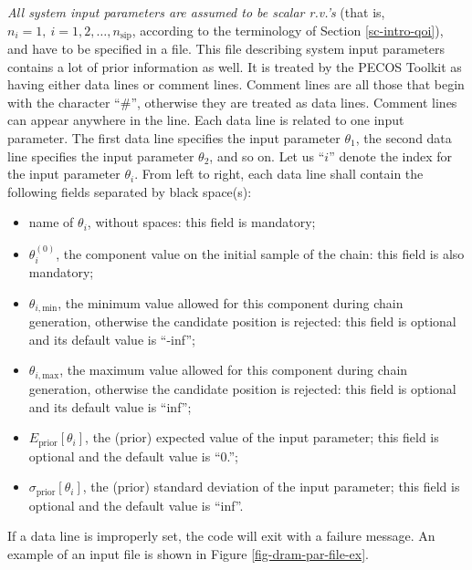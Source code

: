 {\it All system input parameters are assumed to be scalar r.v.'s} (that is, $n_i=1,~i=1,2,\ldots,n_{\text{sip}}$, according to the terminology of Section \ref{sc-intro-qoi}), and
have to be specified in a file.
This file describing system input parameters contains a lot of prior information as well.
It is treated by the PECOS Toolkit as having either data lines or comment lines.
Comment lines are all those that begin with the character ``\#'', otherwise they are treated as data lines.
Comment lines can appear anywhere in the line.
Each data line is related to one input parameter.
The first data line specifies the input parameter $\theta_1$,
the second data line specifies the input parameter $\theta_2$,
and so on.
Let us ``$i$'' denote the index for the input parameter $\theta_i$.
From left to right, each data line shall contain the following fields separated by black space(s):
\begin{itemize}
\item name of $\theta_i$, without spaces: this field is mandatory;
\item $\theta_i^{(0)}$, the component value on the initial sample of the chain: this field is also mandatory;
\item $\theta_{i,\text{min}}$, the minimum value allowed for this component during chain generation, otherwise the candidate position is rejected: this field is optional and its default value is ``-inf'';
\item $\theta_{i,\text{max}}$, the maximum value allowed for this component during chain generation, otherwise the candidate position is rejected: this field is optional and its default value is ``inf'';
\item $E_{\text{prior}}[\theta_i]$, the (prior) expected value of the input parameter; this field is optional and the default value is ``0.'';
\item $\sigma_{\text{prior}}[\theta_i]$, the (prior) standard deviation of the input parameter; this field is optional and the default value is ``inf''.
\end{itemize}
If a data line is improperly set, the code will exit with a failure message.
An example of an input file is shown in Figure \ref{fig-dram-par-file-ex}.


